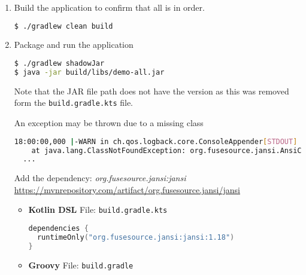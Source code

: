 \begin{enumerate}
\begin{itemize}
\begin{lstlisting}[language=bash]
demo.GreetingControllerTest > initializationError FAILED
    java.lang.ArrayStoreException at AnnotationParser.java:724
\end{lstlisting}

Reverted to the latest working version.
\end{itemize}

\item Build the application to confirm that all is in order.

\begin{lstlisting}[language=bash]
$ ./gradlew clean build
\end{lstlisting}

\item Package and run the application

\begin{lstlisting}[language=bash]
$ ./gradlew shadowJar
$ java -jar build/libs/demo-all.jar
\end{lstlisting}

Note that the JAR file path does not have the version as this was removed form the \texttt{build.gradle.kts} file.

An exception may be thrown due to a missing class

\begin{lstlisting}[language=bash]
18:00:00,000 |-WARN in ch.qos.logback.core.ConsoleAppender[STDOUT] - Failed to create AnsiPrintStream. Falling back on the default stream. java.lang.ClassNotFoundException: org.fusesource.jansi.AnsiConsole
	at java.lang.ClassNotFoundException: org.fusesource.jansi.AnsiConsole
  ...
\end{lstlisting}

Add the dependency: \textit{org.fusesource.jansi:jansi}
\newline
{\footnotesize \url{https://mvnrepository.com/artifact/org.fusesource.jansi/jansi}}

\begin{itemize}

\item[] \textbf{Kotlin DSL}
\newline
File: \texttt{build.gradle.kts}

\begin{lstlisting}[language=Kotlin]
dependencies {
  runtimeOnly("org.fusesource.jansi:jansi:1.18")
}
\end{lstlisting}

\item[] \textbf{Groovy}
\newline
File: \texttt{build.gradle}


\end{itemize}
\end{enumerate}
